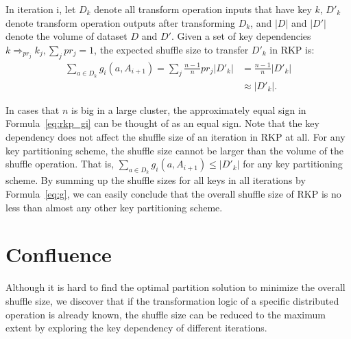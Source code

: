 \documentclass[10pt,journal,compsoc]{IEEEtran}
\begin{document}
In iteration i, let $D_{k}$ denote all transform operation inputs that have key $k$, $D'_{k}$
denote transform operation outputs after transforming $D_{k}$, 
and $|D|$ and $|D'|$ denote the volume of dataset $D$ and $D'$. 
Given a set of key dependencies $k \Rightarrow_{pr_j} k_j, \sum_j pr_j = 1$, 
the expected shuffle size to transfer $D'_k$ in RKP is:
\begin{equation}\label{eq:rkp_gi}
\begin{aligned}
\sum_{a \in D_k} g_i(a, A_{i+1}) = \sum_j \frac{n-1}{n} pr_j  |D'_{k}| 
&= \frac{n-1}{n} |D'_{k}|\\
&\approx |D'_{k}|.
\end{aligned}
\end{equation}

In cases that $n$ is big in a large cluster, the approximately equal sign
in Formula~\ref{eq:rkp_gi} can be thought of as an equal sign. 
Note that the key dependency does not affect the shuffle size of an iteration in RKP at all. 
For any key partitioning scheme, the shuffle size cannot be larger than 
the volume of the shuffle operation. 
That is, $\sum_{a \in D_k} g_i(a, A_{i+1}) \leq |D'_k|$ for any key partitioning scheme.
By summing up the shuffle sizes for all keys in all iterations by Formula~\ref{eq:g},
we can easily conclude that
the overall shuffle size of RKP is no less than almost any other key partitioning scheme. 


\section{Confluence}\label{section:confluence}
Although it is hard to find the optimal partition solution to minimize the overall shuffle size,
we discover that 
if the transformation logic of a specific distributed operation is already known, 
the shuffle size can be reduced to the maximum extent %
by exploring the key dependency of different iterations. 
\end{document}

